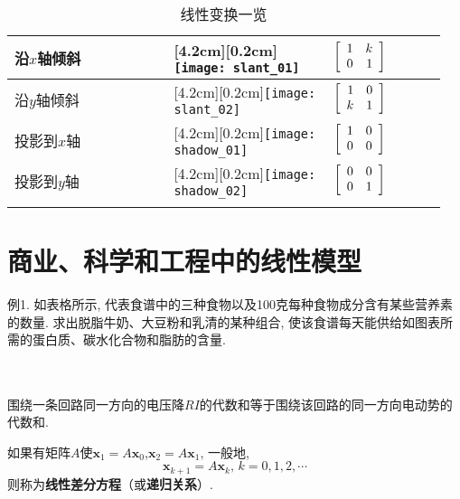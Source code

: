\begin{longtable}{>{\raggedright}m{0.35\linewidth}>{\centering}m{0.35\linewidth}>{\centering\arraybackslash}m{0.25\linewidth}}
沿$x$轴倾斜 & \raisebox{0pt}[4.2cm][0.2cm]{\texttt{[image: slant\_01]}} & $\left[\begin{array}{r r} 1 & k\\ 0 & 1\end{array}\right]$\\\hline
沿$y$轴倾斜 & \raisebox{0pt}[4.2cm][0.2cm]{\texttt{[image: slant\_02]}} & $\left[\begin{array}{r r} 1 & 0\\ k & 1\end{array}\right]$\\\hline
投影到$x$轴 & \raisebox{0pt}[4.2cm][0.2cm]{\texttt{[image: shadow\_01]}} & $\left[\begin{array}{r r} 1 & 0\\ 0 & 0\end{array}\right]$\\\hline
投影到$y$轴 & \raisebox{0pt}[4.2cm][0.2cm]{\texttt{[image: shadow\_02]}} & $\left[\begin{array}{r r} 0 & 0\\ 0 & 1\end{array}\right]$\\\hline
\caption{线性变换一览}
\end{longtable}\vspace{6ex}

\section{商业、科学和工程中的线性模型}
例1. 如表格所示, 代表食谱中的三种食物以及100克每种食物成分含有某些营养素的数量. 求出脱脂牛奶、大豆粉和乳清的某种组合, 使该食谱每天能供给如图表所需的蛋白质、碳水化合物和脂肪的含量.\\
\begin{table}[H]
\begin{tabular}{l c c c c}

\end{tabular}
\end{table}

\begin{law}[基尔霍夫电压定律]\ \\
围绕一条回路同一方向的电压降$RI$的代数和等于围绕该回路的同一方向电动势的代数和.
\end{law}\vspace{4ex}

\begin{law}
如果有矩阵$A$使$\bm{x}_1=A\bm{x}_0$,$\bm{x}_2=A\bm{x}_1$, 一般地,
\[\bm{x}_{k+1}=A\bm{x}_k\text{,\ }k=0,1,2,\cdots\]
则称为\textbf{线性差分方程}（或\textbf{递归关系}）.
\end{law}
